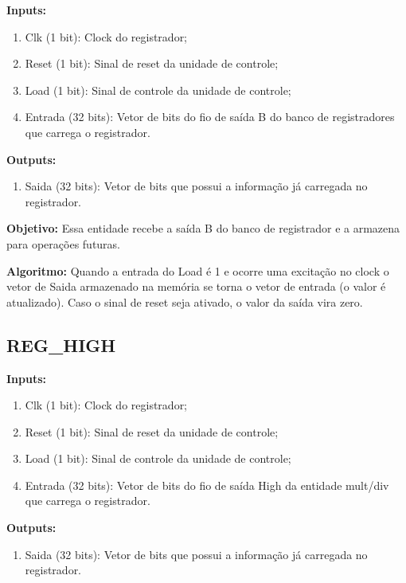 \textbf{Inputs:}

\begin{enumerate}
    \item Clk (1 bit): Clock do registrador;
    \item Reset (1 bit): Sinal de reset da unidade de controle;
    \item Load (1 bit): Sinal de controle da unidade de controle;
    \item Entrada (32 bits): Vetor de bits do fio de saída B do banco de registradores que carrega o registrador.
    
\end{enumerate}

\textbf{Outputs:}

\begin{enumerate}
    \item Saida (32 bits): Vetor de bits que possui a informação já carregada no registrador.
\end{enumerate}

\textbf{Objetivo:} Essa entidade recebe a saída B do banco de registrador e a armazena para operações futuras.

\textbf{Algoritmo:} Quando a entrada do Load é 1 e ocorre uma excitação no clock o vetor de Saida armazenado na memória se torna o vetor de entrada (o valor é atualizado). Caso o sinal de reset seja ativado, o valor da saída vira zero.

\newpage

\subsection{REG\_HIGH}

\textbf{Inputs:}

\begin{enumerate}
    \item Clk (1 bit): Clock do registrador;
    \item Reset (1 bit): Sinal de reset da unidade de controle;
    \item Load (1 bit): Sinal de controle da unidade de controle;
    \item Entrada (32 bits): Vetor de bits do fio de saída High da entidade mult/div que carrega o registrador.
\end{enumerate}

\textbf{Outputs:}

\begin{enumerate}
    \item Saida (32 bits): Vetor de bits que possui a informação já carregada no registrador.
\end{enumerate}

